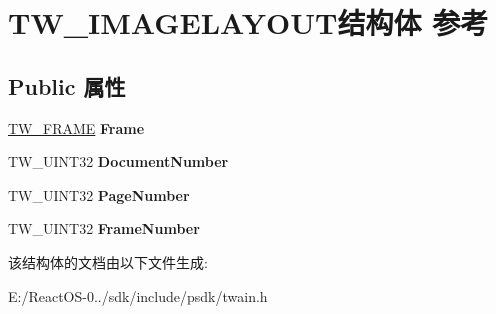 \hypertarget{struct_t_w___i_m_a_g_e_l_a_y_o_u_t}{}\section{T\+W\+\_\+\+I\+M\+A\+G\+E\+L\+A\+Y\+O\+U\+T结构体 参考}
\label{struct_t_w___i_m_a_g_e_l_a_y_o_u_t}
\subsection*{Public 属性}
\begin{DoxyCompactItemize}
\item 
\mbox{\label{struct_t_w___i_m_a_g_e_l_a_y_o_u_t_a706f2fb58cd0e650ddc1eb77aa8aabd7}} 
\hyperlink{struct_t_w___f_r_a_m_e}{T\+W\+\_\+\+F\+R\+A\+ME} {\bfseries Frame}
\item 
\mbox{\label{struct_t_w___i_m_a_g_e_l_a_y_o_u_t_a9cb36b904e3e3a7a9cff3ffbb8d6ddc4}} 
T\+W\+\_\+\+U\+I\+N\+T32 {\bfseries Document\+Number}
\item 
\mbox{\label{struct_t_w___i_m_a_g_e_l_a_y_o_u_t_a3ef3927cfd3266483af6aed5ef354bcf}} 
T\+W\+\_\+\+U\+I\+N\+T32 {\bfseries Page\+Number}
\item 
\mbox{\label{struct_t_w___i_m_a_g_e_l_a_y_o_u_t_a3898a2d6869240bf1c3a9d608e230343}} 
T\+W\+\_\+\+U\+I\+N\+T32 {\bfseries Frame\+Number}
\end{DoxyCompactItemize}


该结构体的文档由以下文件生成\+:\begin{DoxyCompactItemize}
\item 
E\+:/\+React\+O\+S-\/0../sdk/include/psdk/twain.\+h\end{DoxyCompactItemize}
